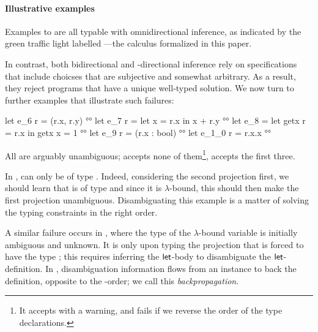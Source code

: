 \documentclass[acmsmall,screen,nonacm,review]{acmart}
\begin{document}
\paragraph{Illustrative examples}


Examples  to  are all typable with omnidirectional
inference, as indicated by the green traffic light labelled \OML---the
calculus formalized in this paper.

%
In contrast, both bidirectional and \Geninst-directional inference
rely on specifications that include choicses that are subjective
and somewhat arbitrary. As a result, they reject programs
that have a unique well-typed solution. We now turn to
further examples that illustrate such failures:
%
\locallabelreset
%
\begin{program}[input]
let e_6 r = (r.x, r.y)                          °°
let e_7 r = let x = r.x in x + r.y              °°
let e_8 = let getx r = r.x in getx {x = 1}      °°
let e_9 r = (r.x : bool)                        °°
let e_1_0 r = r.x.x                              °°
\end{program}
All are arguably unambiguous; \OCaml accepts none of them\footnote{It
accepts  with a warning, and fails if we reverse the order of the
type declarations.}, \OML accepts the first three.

In ,  can only be of type . Indeed,
considering the second projection first, we should learn that
 is of type  and since it is $\lambda$-bound, this
should then make the first projection unambiguous. Disambiguating this example is a matter
of solving the typing constraints in the right order.

A similar failure occurs in , where the type of the
$\lambda$-bound variable  is initially ambiguous and
unknown. It is only upon typing the projection  that
 is forced to have the type ; this requires
inferring the $\mathopen{}\mathrel{\mathsf{let}}$-body to disambiguate the $\mathopen{}\mathrel{\mathsf{let}}$-definition.
%
In , disambiguation information flows from an instance to
back the definition, opposite to the \Geninst-order; we call this
\emph{backpropagation}.
\end{document}
